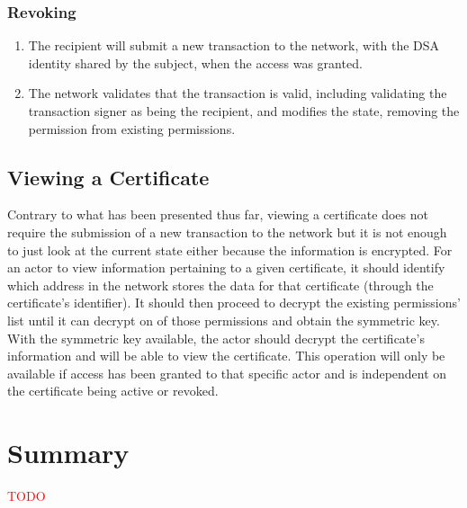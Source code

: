 \subsubsection{Revoking}

\begin{enumerate}
    \item The recipient will submit a new transaction to the network, with the DSA identity shared by the subject, when the access was granted.
    \item The network validates that the transaction is valid, including validating the transaction signer as being the recipient, and modifies the state, removing the permission from existing permissions.
\end{enumerate}

\subsection{Viewing a Certificate}

Contrary to what has been presented thus far, viewing a certificate does not require the submission of a new transaction to the network but it is not enough to just look at the current state either because the information is encrypted. For an actor to view information pertaining to a given certificate, it should identify which address in the network stores the data for that certificate (through the certificate's identifier). It should then proceed to decrypt the existing permissions' list until it can decrypt on of those permissions and obtain the symmetric key. With the symmetric key available, the actor should decrypt the certificate's information and will be able to view the certificate. This operation will only be available if access has been granted to that specific actor and is independent on the certificate being active or revoked.

\section{Summary}

\textcolor{red}{TODO}